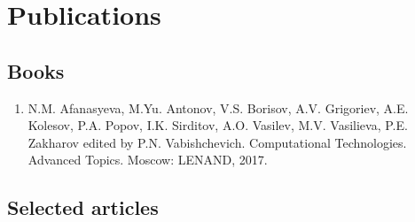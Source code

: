 \documentclass[a4paper]{article}
\begin{document}
\section*{Publications}

\subsection*{Books}
\begin{enumerate}

 
 \item N.M. Afanasyeva, M.Yu. Antonov, V.S. Borisov, A.V. Grigoriev, A.E. Kolesov, P.A. Popov, I.K. Sirditov, A.O. Vasilev, M.V. Vasilieva, P.E. Zakharov edited by P.N. Vabishchevich.
Computational Technologies. Advanced Topics. Moscow: LENAND, 2017.

\end{enumerate} 

\subsection*{Selected articles}
\end{document}

